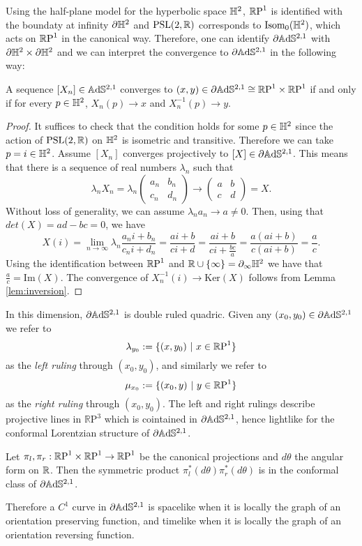 Using the half-plane model for the hyperbolic space $\H^2$, $\S$ is identified with the boundaty at infinity $\partial \H^2$ and $\PSL$ corresponds to $\text{Isom}_0(\H^2)$, which acts on $\S$ in the canonical way.
Therefore, one can identify $\partial \A^{2,1}$ with $\partial \H^2 \times \partial \H^2$ and we can interpret the convergence to $\partial \A^{2,1}$ in the following way:
\begin{lemma} \label{lem:convergence}
    A sequence $[X_n] \in \A^{2,1}$ converges to $(x,y) \in \partial \A^{2,1} \cong \T$ if and only if for every $p\in\H^2$, $X_n(p) \to x$ and $X_n^{-1}(p) \to y$.
\end{lemma}

\begin{proof}
    It suffices to check that the condition holds for some $p\in\H^2$ since the action of $\PSL$ on $\H^2$ is isometric and transitive. Therefore we can take $p=i\in\H^2$. Assume $\left[ X_n \right]$ converges projectively to $\left[ X \right] \in \partial\A^{2,1}$. This means that there is a sequence of real numbers $\lambda_n$ such that
    \[
       \lambda_n X_n = \lambda_n
       \begin{pmatrix}
            a_n & b_n \\ c_n & d_n
        \end{pmatrix} \to
        \begin{pmatrix}
            a & b \\ c & d
        \end{pmatrix} =X.
    \]
    Without loss of generality, we can assume $\lambda_n a_n \to a \neq 0$. Then, using that $det(X)=ad-bc=0$, we have
    \[
        X(i) = \lim_{n\to \infty} \lambda_n \frac{a_n i + b_n}{c_n i + d_n} = \frac{ai +b}{ci+d} = \frac{ai + b}{ ci + \frac{bc}{a}} = \frac{a(ai+b)}{c(ai+b)} = \frac{a}{c}.
    \]
    Using the identification between $\S$ and $\R \cup \{ \infty \} = \partial_\infty \H^2$ we have that $\frac{a}{c} = \text{Im}(X)$. The convergence of $X_n^{-1}(i) \to \text{Ker}(X)$ follows from Lemma \ref{lem:inversion}.
\end{proof}

In this dimension, $\partial\A^{2,1}$ is double ruled quadric. Given any $(x_0,y_0) \in \partial\A^{2,1}$ we refer to
\[
    \lambda_{y_0} := \{ (x,y_0) \ | \ x \in\S \}
\]
as the \textit{left ruling} through $(x_0,y_0)$, and similarly we refer to
\[
    \mu_{x_0} := \{ (x_0,y) \ | \ y \in\S \}
\]
as the \textit{right ruling} through $(x_0,y_0)$. The left and right rulings describe projective lines in $\mathbb{R} \text{P}^3$ which is cointained in $\partial\A^{2,1}$, hence lightlike for the conformal Lorentzian structure of $\partial\A^{2,1}$.
\begin{proposition} \label{prop:angular}
    Let $\pi_l, \pi_r : \T \to\S$ be the canonical projections and $d\theta$ the angular form on $\R$. Then the symmetric product $\pi_l^*(d\theta)\pi_r^*(d\theta)$ is in the conformal class of $\partial\A^{2,1}$.
\end{proposition}
Therefore a $C^1$ curve in $\partial\A^{2,1}$ is spacelike when it is locally the graph of an orientation preserving function, and timelike when it is locally the graph of an orientation reversing function.


